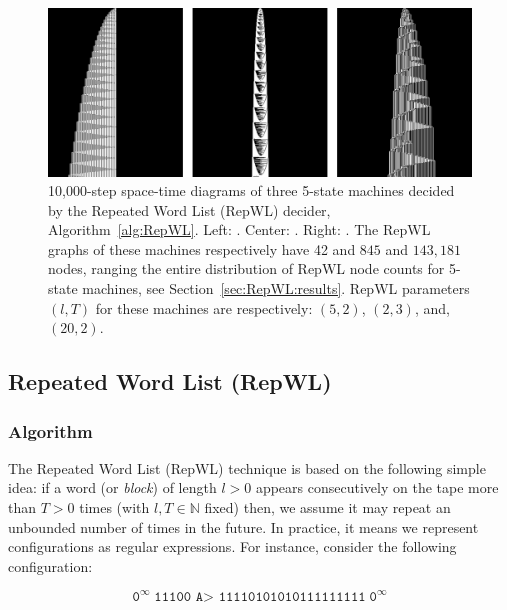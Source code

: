 \begin{figure}[h!]
    \centering
    \includegraphics[scale=0.48]{figures/RepWL/RepWL_three_machines.pdf}
    \caption{10,000-step space-time diagrams of three 5-state machines decided by the Repeated Word List (RepWL) decider, Algorithm~\ref{alg:RepWL}. Left: {\small {}}. Center: {\small {}}. Right: {\small {}}. The RepWL graphs of these machines respectively have 42 and $845$ and $143{,}181$ nodes, ranging the entire distribution of RepWL node counts for 5-state machines, see Section~\ref{sec:RepWL:results}. RepWL parameters $(l,T)$ for these machines are respectively: $(5,2)$, $(2,3)$, and, $(20,2)$.
    }\label{fig:repWLThree}
\end{figure}

\subsection{Repeated Word List (RepWL)}\label{sec:RepWL}

\subsubsection{Algorithm}

The Repeated Word List (RepWL) technique is based on the following simple idea: if a word (or \textit{block}) of length $l > 0$ appears consecutively on the tape more than $T > 0$ times (with $l, T \in \mathbb{N}$ fixed) then, we assume it may repeat an unbounded number of times in the future. In practice, it means we represent configurations as regular expressions. For instance, consider the following configuration:

$$ \texttt{0}^\infty \; \texttt{11100 A> 11110101010111111111} \; \texttt{0}^\infty$$


